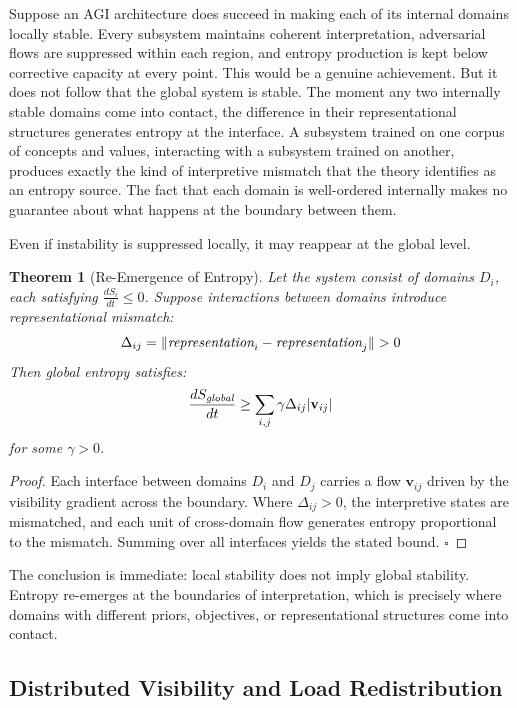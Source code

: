 \documentclass[12pt,a4paper]{article}
\newtheorem{theorem}{Theorem}
\begin{document}
Suppose an AGI architecture does succeed in making each of its internal domains locally stable. Every subsystem maintains coherent interpretation, adversarial flows are suppressed within each region, and entropy production is kept below corrective capacity at every point. This would be a genuine achievement. But it does not follow that the global system is stable. The moment any two internally stable domains come into contact, the difference in their representational structures generates entropy at the interface. A subsystem trained on one corpus of concepts and values, interacting with a subsystem trained on another, produces exactly the kind of interpretive mismatch that the theory identifies as an entropy source. The fact that each domain is well-ordered internally makes no guarantee about what happens at the boundary between them.

Even if instability is suppressed locally, it may reappear at the global level.

\begin{theorem}[Re-Emergence of Entropy]
Let the system consist of domains $D_i$, each satisfying $\frac{dS_i}{dt} \leq 0$. Suppose interactions between domains introduce representational mismatch:
\[
\Delta_{ij} = \|\emph{representation}_i - \emph{representation}_j\| > 0
\]
Then global entropy satisfies:
\[
\frac{dS_{\emph{global}}}{dt}
\geq
\sum_{i,j} \gamma \Delta_{ij} |\mathbf{v}_{ij}|
\]
for some $\gamma > 0$.
\end{theorem}

\begin{proof}
Each interface between domains $D_i$ and $D_j$ carries a flow $\mathbf{v}_{ij}$ driven by the visibility gradient across the boundary. Where $\Delta_{ij} > 0$, the interpretive states are mismatched, and each unit of cross-domain flow generates entropy proportional to the mismatch. Summing over all interfaces yields the stated bound. \hfill$\square$
\end{proof}

The conclusion is immediate: local stability does not imply global stability. Entropy re-emerges at the boundaries of interpretation, which is precisely where domains with different priors, objectives, or representational structures come into contact.


\subsection{Distributed Visibility and Load Redistribution}
\end{document}

